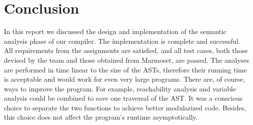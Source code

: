 \documentclass[a4paper, notitlepage]{report}
\begin{document}
\chapter{Conclusion}
In this report we discussed the design and implementation of the semantic analysis phase of our compiler. The implementation is complete and successful. All requirements from the assignments are satisfied, and all test cases, both those devised by the team and those obtained from Marmoset, are passed. The analyses are performed in time linear to the size of the ASTs, therefore their running time is acceptable and would work for even very large programs. There are, of course, ways to improve the program. For example, reachability analysis and variable analysis could be combined to save one traversal of the AST. It was a conscious choice to separate the two functions to achieve better modularized code. Besides, this choice does not affect the program's runtime asymptotically.




\end{document}
